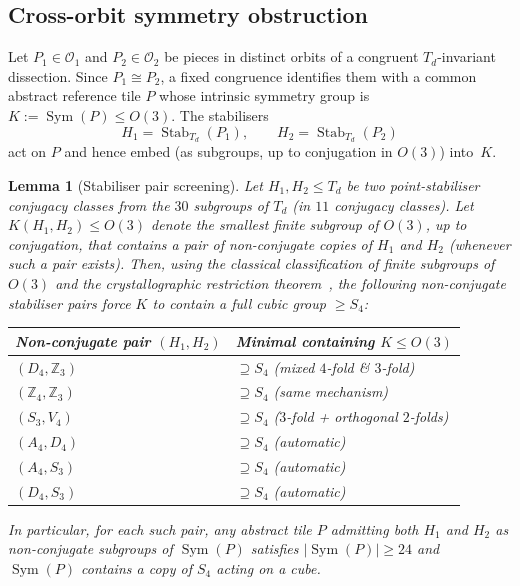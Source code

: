 \documentclass[11pt,a4paper]{article}
\theoremstyle{plain}
\newtheorem{lemma}[lemma]{Lemma}
\theoremstyle{definition}
\theoremstyle{remark}
\DeclareMathOperator{\Sym}{Sym}
\DeclareMathOperator{\Stab}{Stab}
\newcommand{\Td}{T_{\!d}}
\newcommand{\Z}{\mathbb{Z}}
\newcommand{\calO}{\mathcal{O}}
\begin{document}
\subsection{Cross-orbit symmetry obstruction}

Let $P_{1} \in \calO_{1}$ and $P_{2} \in \calO_{2}$ be pieces in distinct
orbits of a congruent $\Td$-invariant dissection.  Since $P_{1} \cong P_{2}$,
a fixed congruence identifies them with a common abstract reference tile
$P$ whose intrinsic symmetry group is $K := \Sym(P) \leq O(3)$.  The
stabilisers
\[
  H_{1} = \Stab_{\Td}(P_{1}), \qquad H_{2} = \Stab_{\Td}(P_{2})
\]
act on $P$ and hence embed (as subgroups, up to conjugation in $O(3)$) into~$K$.

\begin{lemma}[Stabiliser pair screening]\label{lem:stab-embed}
Let $H_{1}, H_{2} \leq \Td$ be two point-stabiliser conjugacy classes from
the $30$ subgroups of $\Td$ (in $11$ conjugacy classes).  Let
$K(H_{1}, H_{2}) \leq O(3)$ denote the smallest finite subgroup of
$O(3)$, up to conjugation, that contains a pair of non-conjugate copies of
$H_{1}$ and $H_{2}$ (whenever such a pair exists).  Then, using the
classical classification of finite subgroups of $O(3)$ and the
crystallographic restriction theorem~\cite{Hiller1985}, the following
non-conjugate stabiliser pairs force $K$ to contain a full cubic group
$\geq S_{4}$:
\begin{center}
\begin{tabular}{@{}ll@{}}
\toprule
Non-conjugate pair $(H_{1}, H_{2})$ & Minimal containing $K \leq O(3)$ \\
\midrule
$(D_{4}, \Z_{3})$      & $\supseteq S_{4}$ \quad (mixed $4$-fold \& $3$-fold) \\
$(\Z_{4}, \Z_{3})$      & $\supseteq S_{4}$ \quad (same mechanism) \\
$(S_{3}, V_{4})$       & $\supseteq S_{4}$ \quad ($3$-fold + orthogonal $2$-folds) \\
$(A_{4}, D_{4})$       & $\supseteq S_{4}$ \quad (automatic) \\
$(A_{4}, S_{3})$       & $\supseteq S_{4}$ \quad (automatic) \\
$(D_{4}, S_{3})$       & $\supseteq S_{4}$ \quad (automatic) \\
\bottomrule
\end{tabular}
\end{center}
In particular, for each such pair, any abstract tile $P$ admitting both
$H_{1}$ and $H_{2}$ as non-conjugate subgroups of $\Sym(P)$ satisfies
$|\Sym(P)| \geq 24$ and $\Sym(P)$ contains a copy of $S_{4}$ acting on a
cube.
\end{lemma}
\end{document}
